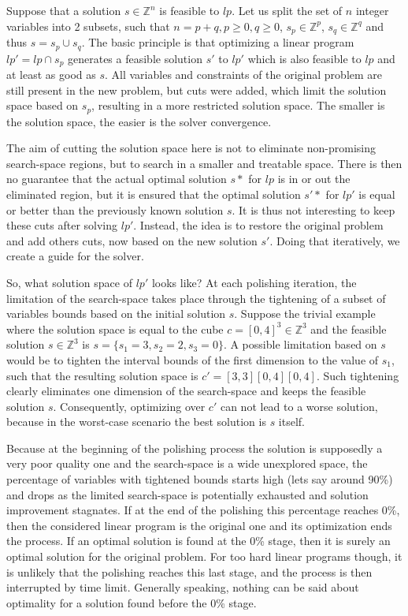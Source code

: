 Suppose that a solution $s \in \mathbb{Z}^n$ is feasible to $lp$. Let us split the set of $n$ integer variables into 2 subsets, such that $n=p+q, p \ge 0, q\ge 0$, $s_p \in \mathbb{Z}^p$, $s_q \in \mathbb{Z}^q$ and thus $s = s_p \cup s_q$. The basic principle is that optimizing a linear program $lp' = lp \cap s_p$ generates a feasible solution $s'$ to $lp'$ which is also feasible to $lp$ and at least as good as $s$. All variables and constraints of the original problem are still present in the new problem, but cuts were added, which limit the solution space based on $s_p$, resulting in a more restricted solution space. The smaller is the solution space, the easier is the solver convergence.

The aim of cutting the solution space here is not to eliminate non-promising search-space regions, but to search in a smaller and treatable space. There is then no guarantee that the actual optimal solution $s*$ for $lp$ is in or out the eliminated region, but it is ensured that the optimal solution $s'*$ for $lp'$ is equal or better than the previously known solution $s$. It is thus not interesting to keep these cuts after solving $lp'$. Instead, the idea is to restore the original problem and add others cuts, now based on the new solution $s'$. Doing that iteratively, we create a guide for the solver.

So, what solution space of $lp'$ looks like? At each polishing iteration, the limitation of the search-space takes place through the tightening of a subset of variables bounds based on the initial solution $s$. Suppose the trivial example where the solution space is equal to the cube $c = [0, 4]^3 \in \mathbb{Z}^3$ and the feasible solution $s \in \mathbb{Z}^3$ is $s = \{s_1=3,s_2=2,s_3=0\}$. A possible limitation based on $s$ would be to tighten the interval bounds of the first dimension to the value of $s_1$, such that the resulting solution space is $c' = [3, 3][0, 4][0, 4]$. Such tightening clearly eliminates one dimension of the search-space and keeps the feasible solution $s$. Consequently, optimizing over $c'$ can not lead to a worse solution, because in the worst-case scenario the best solution is $s$ itself.

Because at the beginning of the polishing process the solution is supposedly a very poor quality one and the search-space is a wide unexplored space, the percentage of variables with tightened bounds starts high (lets say around 90\%) and drops as the limited search-space is potentially exhausted and solution improvement stagnates. If at the end of the polishing this percentage reaches 0\%, then the considered linear program is the original one and its optimization ends the process. If an optimal solution is found at the 0\% stage, then it is surely an optimal solution for the original problem. For too hard linear programs though, it is unlikely that the polishing reaches this last stage, and the process is then interrupted by time limit. Generally speaking, nothing can be said about optimality for a solution found before the 0\% stage.



